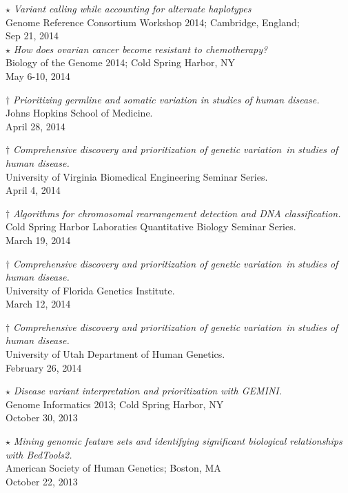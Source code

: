 \documentclass[margin,line]{cv}
\begin{document}
\begin{resume}
    $\star$ \textit{Variant calling while accounting for 
    alternate haplotypes} \\
    Genome Reference Consortium Workshop 2014; Cambridge, England; \\
    Sep 21, 2014 \\

    $\star$ \textit{How does ovarian cancer become resistant to chemotherapy?} \\
    Biology of the Genome 2014; Cold Spring Harbor, NY \\
    May 6-10, 2014

    $\dagger$ \textit{Prioritizing germline and somatic variation in studies of human disease.} \\
    Johns Hopkins School of Medicine. \\
    April 28, 2014

    $\dagger$ \textit{Comprehensive discovery and prioritization of genetic variation in studies of human disease.} \\
    University of Virginia Biomedical Engineering Seminar Series. \\
    April 4, 2014

    $\dagger$ \textit{Algorithms for chromosomal rearrangement detection and DNA classification.} \\
    Cold Spring Harbor Laboraties Quantitative Biology Seminar Series. \\
    March 19, 2014

    $\dagger$ \textit{Comprehensive discovery and prioritization of genetic variation in studies of human disease.} \\
    University of Florida Genetics Institute. \\
    March 12, 2014

    $\dagger$ \textit{Comprehensive discovery and prioritization of genetic variation in studies of human disease.} \\
    University of Utah Department of Human Genetics. \\
    February 26, 2014

    $\star$ \textit{Disease variant interpretation and prioritization with GEMINI.} \\
    Genome Informatics 2013; Cold Spring Harbor, NY \\
    October 30, 2013

    $\star$ \textit{Mining genomic feature sets and identifying significant biological relationships with BedTools2.} \\
    American Society of Human Genetics; Boston, MA \\
    October 22, 2013


\end{resume}
\end{document}
